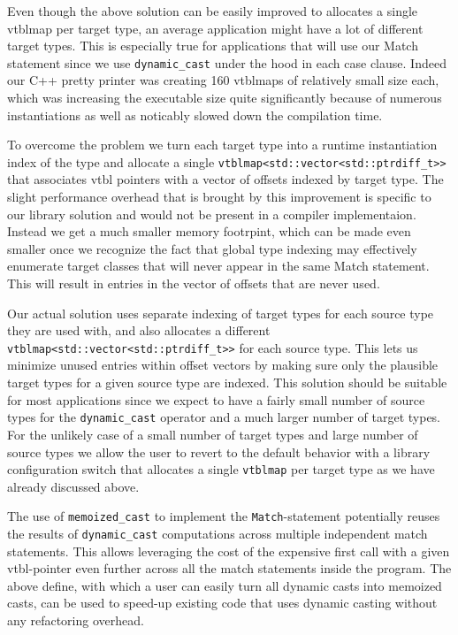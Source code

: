 \documentclass[preprint]{sigplanconf}
\makeatletter
\DeclareRobustCommand{\code}[1]{{\lstinline[breaklines=false,escapechar=@]{#1}}}
\makeatother
\begin{document}
Even though the above solution can be easily improved to allocates a single 
vtblmap per target type, an average application might have a lot of different 
target types. This is especially true for applications that will use our Match 
statement since we use \code{dynamic_cast} under the hood in each case clause. 
Indeed our C++ pretty printer was creating 160 vtblmaps of relatively small size 
each, which was increasing the executable size quite significantly because of 
numerous instantiations as well as noticably slowed down the compilation time.

To overcome the problem we turn each target type into a runtime instantiation 
index of the type and allocate a single \code{vtblmap<std::vector<std::ptrdiff_t>>} 
that associates vtbl pointers with a vector of offsets indexed by target type. 
The slight performance overhead that is brought by this improvement is specific 
to our library solution and would not be present in a compiler implementaion. 
Instead we get a much smaller memory footrpint, which can be made even smaller 
once we recognize the fact that global type indexing may effectively enumerate 
target classes that will never appear in the same Match statement. This will 
result in entries in the vector of offsets that are never used.

Our actual solution uses separate indexing of target types for each source type 
they are used with, and also allocates a different 
\code{vtblmap<std::vector<std::ptrdiff_t>>} for each source type. This lets us 
minimize unused entries within offset vectors by making sure only the plausible 
target types for a given source type are indexed. This solution should be 
suitable for most applications since we expect to have a fairly small 
number of source types for the \code{dynamic_cast} operator and a much larger number 
of target types. For the unlikely case of a small number of target types and large 
number of source types we allow the user to revert to the default behavior with a 
library configuration switch that allocates a single \code{vtblmap} per target type as 
we have already discussed above.

The use of \code{memoized_cast} to implement the \code{Match}-statement potentially reuses the 
results of \code{dynamic_cast} computations across multiple independent match 
statements. This allows leveraging the cost of the expensive first call with a 
given vtbl-pointer even further across all the match statements inside the 
program. The above define, with which a user can easily turn all dynamic casts 
into memoized casts, can be used to speed-up existing code that uses dynamic 
casting without any refactoring overhead.
\end{document}
